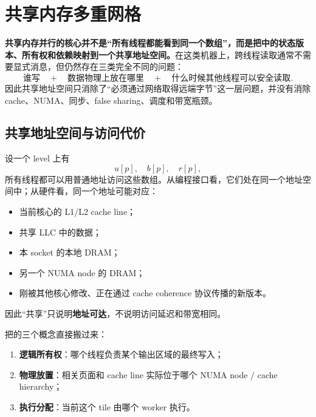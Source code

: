 \chapter{共享内存多重网格}
\label{ch:shared-memory}

\begin{keybox}
\textbf{共享内存并行的核心并不是“所有线程都能看到同一个数组”，而是把中的状态版本、所有权和依赖映射到一个共享地址空间。}在这类机器上，跨线程读取通常不需要显式消息，但仍然存在三类完全不同的问题：
\begin{equation}
\boxed{
\text{谁写}
\quad+\quad
\text{数据物理上放在哪里}
\quad+\quad
\text{什么时候其他线程可以安全读取}.
}
\label{eq:shared-memory-three-questions}
\end{equation}
因此共享地址空间只消除了“必须通过网络取得远端字节”这一层问题，并没有消除 cache、NUMA、同步、false sharing、调度和带宽瓶颈。
\end{keybox}

\section{共享地址空间与访问代价}

设一个 level 上有
\begin{equation}
u[p],\quad b[p],\quad r[p],
\end{equation}
所有线程都可以用普通地址访问这些数组。从编程接口看，它们处在同一个地址空间中；从硬件看，同一个地址可能对应：

\begin{itemize}
\item 当前核心的 L1/L2 cache line；
\item 共享 LLC 中的数据；
\item 本 socket 的本地 DRAM；
\item 另一个 NUMA node 的 DRAM；
\item 刚被其他核心修改、正在通过 cache coherence 协议传播的新版本。
\end{itemize}

因此“共享”只说明\textbf{地址可达}，不说明访问延迟和带宽相同。

把的三个概念直接搬过来：

\begin{enumerate}
\item \textbf{逻辑所有权}：哪个线程负责某个输出区域的最终写入；
\item \textbf{物理放置}：相关页面和 cache line 实际位于哪个 NUMA node / cache hierarchy；
\item \textbf{执行分配}：当前这个 tile 由哪个 worker 执行。
\end{enumerate}

